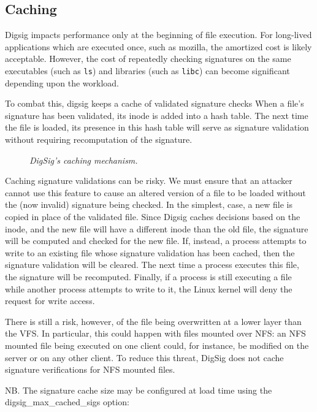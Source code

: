 \documentclass{article}
\begin{document}
\subsection{Caching}
\label{sec:caching}
Digsig impacts performance only at the beginning of file execution.  For
long-lived applications which are executed once, such as mozilla, the
amortized cost is likely acceptable.  However, the cost of repeatedly
checking signatures on the same executables (such as {\tt ls}) and
libraries (such as {\tt libc}) can become significant depending upon
the workload.

To combat this, digsig keeps a cache of validated signature checks
When a file's signature has been validated, its inode is added into
a hash table.  The next time the file is loaded, its presence in
this hash table will serve as signature validation without requiring
recomputation of the signature.

\begin{figure}
\begin{center}
\epsfxsize=4in
\caption{{\it DigSig's caching mechanism.}}
\label{fig-elf}
\end{center}
\end{figure}

Caching signature validations can be risky.  We must ensure that an
attacker cannot use this feature to cause an altered version of a file
to be loaded without the (now invalid) signature being checked.  In
the simplest, case, a new file is copied in place of the validated file.
Since Digsig caches decisions based on the inode, and the new file will
have a different
inode than the old file, the signature will be computed and checked for the
new file.  If, instead, a process attempts to write to an existing file
whose signature validation has been cached, then the signature
validation will be cleared.  The next time a process executes this file,
the signature will be recomputed.  Finally, if a process is still
executing a file while another process attempts to write to it, the
Linux kernel will deny the request for write access.

There is still a risk, however, of the file being overwritten at a lower
layer than the VFS.  In particular, this could happen with files mounted
over NFS: an NFS mounted file being executed on one client could, for
instance, be modified on the server or on any other client. 
To reduce this threat, DigSig
does not cache signature verifications for NFS mounted files. 

NB. The signature cache size may be configured at load time 
using the digsig\_max\_cached\_sigs option:
\end{document}

